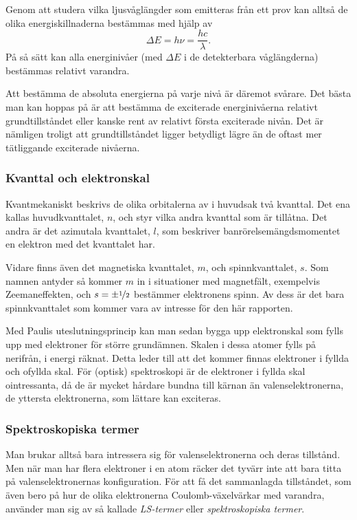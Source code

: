 \documentclass[11pt,a4paper]{article}
\begin{document}
 
Genom att studera vilka ljusvåglängder som emitteras från ett prov
kan alltså de olika energiskillnaderna bestämmas med hjälp av  
\[\Delta E = h\nu=\frac{hc}{\lambda}.\]
På så sätt kan alla energinivåer (med $\Delta E$ i de detekterbara
våglängderna) bestämmas relativt varandra. 

Att bestämma de absoluta
energierna på varje nivå är däremot svårare. Det bästa man kan hoppas
på är att bestämma de exciterade energinivåerna relativt
grundtillståndet eller kanske rent av relativt första exciterade
nivån. Det är nämligen troligt att grundtillståndet ligger betydligt
lägre än de oftast mer tätliggande exciterade nivåerna. 

\subsubsection{Kvanttal och elektronskal}
Kvantmekaniskt beskrivs de olika orbitalerna av i huvudsak två
kvanttal. Det ena kallas huvudkvanttalet, $n$, och styr vilka andra
kvanttal som är tillåtna. Det andra är det azimutala kvanttalet, $l$,
som beskriver banrörelsemängdsmomentet en elektron med det kvanttalet
har. 

Vidare finns även det magnetiska kvanttalet, $m$, och spinnkvanttalet,
$s$. Som namnen antyder så kommer $m$ in i situationer med magnetfält,
exempelvis Zeemaneffekten, och $s=\pm\nicefrac{1}{2}$ bestämmer
elektronens spinn. 
Av dess är det bara spinnkvanttalet som kommer vara av intresse för
den här rapporten.  

Med Paulis uteslutningsprincip kan man sedan bygga upp elektronskal
som fylls upp med elektroner för större grundämnen. Skalen i dessa
atomer fylls på nerifrån, i energi räknat. Detta leder till att det
kommer finnas elektroner i fyllda och ofyllda skal. För (optisk)
spektroskopi är de elektroner i fyllda skal ointressanta, då de är
mycket hårdare bundna till kärnan än valenselektronerna, de yttersta
elektronerna, som lättare kan exciteras. 



\subsubsection{Spektroskopiska termer}\label{sec:term}
Man brukar alltså bara intressera sig för valenselektronerna och deras
tillstånd. Men när man har flera elektroner i en atom räcker det
tyvärr inte att bara titta på valenselektronernas konfiguration. För att
få det sammanlagda tillståndet, som även bero på hur de olika
elektronerna Coulomb-växelvärkar med varandra, använder man sig av så
kallade \emph{LS-termer} eller \emph{spektroskopiska termer}.
\end{document}
